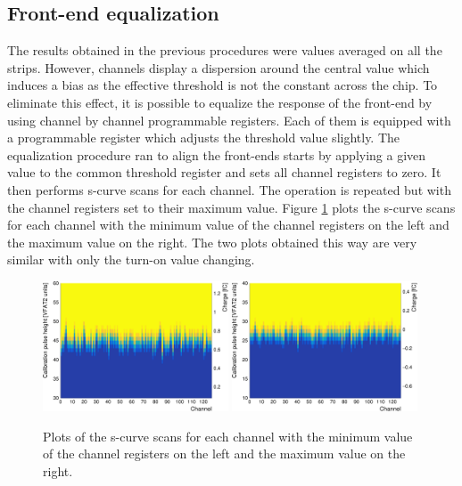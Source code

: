     \subsection{Front-end equalization}

      The results obtained in the previous procedures were values averaged on all the strips. However, channels display a dispersion around the central value which induces a bias as the effective threshold is not the constant across the chip. To eliminate this effect, it is possible to equalize the response of the front-end by using channel by channel programmable registers. Each of them is equipped with a programmable register which adjusts the threshold value slightly. The equalization procedure ran to align the front-ends starts by applying a given value to the common threshold register and sets all channel registers to zero. It then performs s-curve scans for each channel. The operation is repeated but with the channel registers set to their maximum value. Figure \ref{fig:II-5-trim} plots the s-curve scans for each channel with the minimum value of the channel registers on the left and the maximum value on the right. The two plots obtained this way are very similar with only the turn-on value changing. \\

      \begin{figure}[h!]
        \centering
        \includegraphics[width=0.49\textwidth]{img/plots/cSCurve_ChannelVCal_Trim0-crop}
        \includegraphics[width=0.49\textwidth]{img/plots/cSCurve_ChannelVCal_Trim1-crop}
        \caption{Plots of the s-curve scans for each channel with the minimum value of the channel registers on the left and the maximum value on the right.}
        \label{fig:II-5-trim}
      \end{figure}

